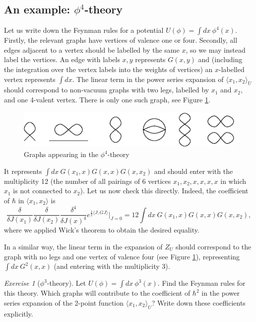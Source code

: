 \documentclass[10pt]{amsart}
\theoremstyle{definition}
\theoremstyle{remark}
\newtheorem{exs}[thm]{Exercise}
\def\<{\langle}
\def\>{\rangle}
\newcommand{\h}{\hbar}
\newcommand{\Gd}{\delta}
\begin{document}
\subsection{An example: $\phi^4$-theory}
Let us write down the Feynman rules for a potential $U(\phi)=\int
dx\ \phi^4(x)$. Firstly, the relevant graphs have vertices of
valence one or four. Secondly, all edges adjacent to a vertex
should be labelled by the same $x$, so we may instead label the
vertices. An edge with labels $x,y$ represents $G(x,y)$ and
(including the integration over the vertex labels into the weights
of vertices) an $x$-labelled vertex represents $\int dx$. The
linear term in the power series expansion of $\<x_1,x_2\>_U$
should correspond to non-vacuum graphs with two legs, labelled by
$x_1$ and $x_2$, and one 4-valent vertex. There is only one such
graph, see Figure \ref{fig_phi4}.
\begin{figure}
\includegraphics[height=0.75in]{phifour.eps}
\caption{Graphs appearing in the $\phi^4$-theory} \label{fig_phi4}
\end{figure}
It represents $\int dx\ G(x_1,x)G(x,x)G(x,x_2)$ and should enter
with the multiplicity 12 (the number of all pairings of 6 vertices
$x_1,x_2,x,x,x,x$ in which $x_1$ is not connected to $x_2$). Let
us now check this directly. Indeed, the coefficient of $\h$ in
$\<x_1,x_2\>$ is
$$\frac{\Gd}{\Gd J(x_1)}\frac{\Gd}{\Gd J(x_2)}
\frac{\Gd^4}{\Gd J(x)^4} e^{\frac12\<J,GJ\>}\big|_{J=0}= 12\int
dx\ G(x_1,x)G(x,x)G(x,x_2),$$ where we applied Wick's theorem to
obtain the desired equality.

In a similar way, the linear term in the expansion of $Z_U$ should
correspond to the graph with no legs and one vertex of valence
four (see Figure \ref{fig_phi4}), representing $\int dx\ G^2(x,x)$
(and entering with the multiplicity 3).

\begin{exs}[$\phi^3$-theory]
Let $U(\phi)=\int dx\ \phi^3(x)$. Find the Feynman rules for this
theory. Which graphs will contribute to the coefficient of $\h^2$
in the power series expansion of the 2-point function
$\<x_1,x_2\>_U$? Write down these coefficients explicitly.
\end{exs}
\end{document}
